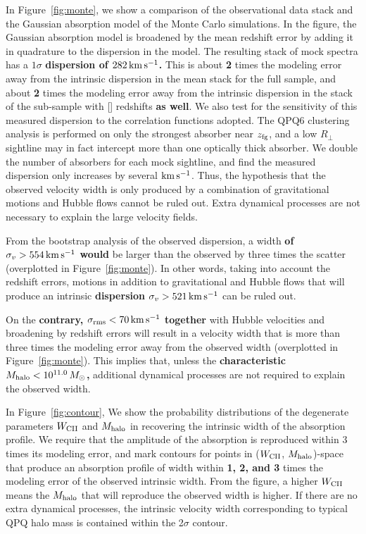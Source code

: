 \documentclass[iop]{emulateapj}
\begin{document}
{In Figure~\ref{fig:monte}, we show a comparison of the observational data stack and the Gaussian 
absorption model of the Monte Carlo simulations. In the figure, the Gaussian absorption model is 
broadened by the mean redshift error by adding it in quadrature to the dispersion in the model. 
The resulting stack of mock spectra has a $1\sigma$ {\bf dispersion of $282\,{\rm km\,s^{-1}}$.} This is
about {\bf 2} times the modeling error away from the intrinsic dispersion in the  mean stack
for the full sample, and about {\bf 2} times the modeling error away from the intrinsic dispersion in the
stack of the sub-sample with [] redshifts {\bf as well}. We also test for the
sensitivity of this measured dispersion to the correlation functions adopted. The QPQ6 clustering 
analysis is performed on only the strongest absorber near $z_{\rm fg}$, and a low $R_\perp$ 
sightline may in fact intercept more than one optically thick absorber. We double the number of 
absorbers for each mock sightline, and find the measured dispersion only increases by several 
${\rm km\,s^{-1}}$. Thus, the hypothesis that the observed velocity width is only produced by a 
combination of gravitational motions and Hubble flows cannot be ruled out. Extra dynamical 
processes are not necessary to explain the large velocity fields. 

From the bootstrap analysis of the observed dispersion, a width {\bf of
$\sigma_v>554\,{\rm km\,s^{-1}}$ would} be larger than the observed by three times the scatter
(overplotted in Figure~\ref{fig:monte}). In other words, taking into account the redshift errors,
motions in addition to gravitational and Hubble flows that will produce an intrinsic {\bf dispersion
$\sigma_v>521\,{\rm km\,s^{-1}}$} can be ruled out.

On the {\bf contrary,
$\sigma_{\rm rms}<70\,{\rm km\,s^{-1}}$ together} with Hubble velocities and
broadening by redshift errors will result in a velocity width that is more than three times the 
modeling error away from the observed width (overplotted in Figure~\ref{fig:monte}). This implies 
that, unless the {\bf characteristic $M_{\rm halo}<10^{11.0}\,M_\odot$,}
additional dynamical processes are not required to explain the observed width.  

In Figure~\ref{fig:contour}, We show the probability distributions of the degenerate parameters 
$W_{\rm CII}$ and $M_{\rm halo}$ in recovering the intrinsic width of the absorption profile. We 
require that the amplitude of the absorption is reproduced within 3 times its modeling error, and 
mark contours for points in ($W_{\rm CII}$, $M_{\rm halo}$)-space that produce an absorption 
profile of width within {\bf 1, 2, and 3} times the modeling error of the observed intrinsic width.
From the figure, a higher $W_{\rm CII}$ means the $M_{\rm halo}$ that will reproduce the observed 
width is higher. If there are no extra dynamical processes, the intrinsic velocity width 
corresponding to typical QPQ halo mass is contained within the 2$\sigma$ contour.

}
\end{document}
